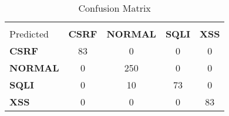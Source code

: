 
\begin{table}[h!]
\centering
\caption{Confusion Matrix}
\label{tab:confusion_matrix}
\begin{tabular}{|l|c|c|c|c|}
\hline
\textbf{True \\ Predicted} & \textbf{CSRF} & \textbf{NORMAL} & \textbf{SQLI} & \textbf{XSS} \\
\hline
\textbf{CSRF} & 83 & 0 & 0 & 0 \\
\textbf{NORMAL} & 0 & 250 & 0 & 0 \\
\textbf{SQLI} & 0 & 10 & 73 & 0 \\
\textbf{XSS} & 0 & 0 & 0 & 83 \\
\hline
\end{tabular}
\end{table}

